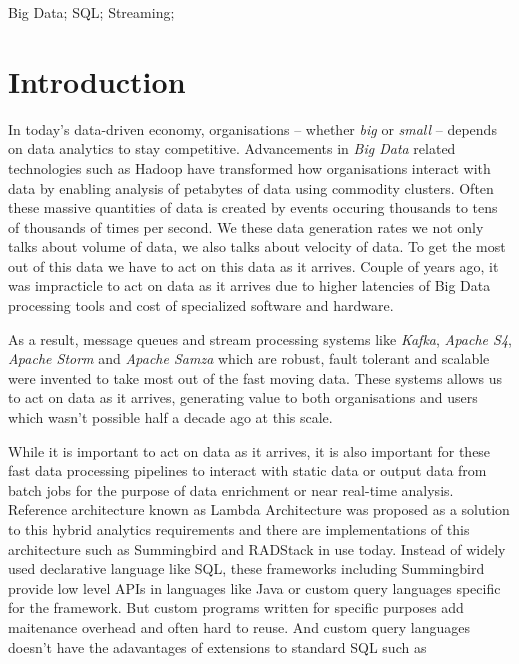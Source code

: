 \documentclass[10pt, conference, compsocconf]{IEEEtran}
\begin{document}
\begin{IEEEkeywords}
Big Data; SQL; Streaming;

\end{IEEEkeywords}


%
\IEEEpeerreviewmaketitle



\section{Introduction}
In today's data-driven economy, organisations -- whether \textit{big} or \textit{small} -- depends on data analytics to stay competitive. Advancements in \textit{Big Data} related technologies such as Hadoop have transformed how organisations interact with data by enabling analysis of petabytes of data using commodity clusters. Often these massive quantities of data is created by events occuring thousands to tens of thousands of times per second. We these data generation rates we not only talks about volume of data, we also talks about velocity of data. To get the most out of this data we have to act on this data as it arrives. Couple of years ago, it was impracticle to act on data as it arrives due to higher latencies of Big Data processing tools and cost of specialized software and hardware. 

As a result,  message queues and stream processing systems like \textit{Kafka}, \textit{Apache S4}, \textit{Apache Storm} and \textit{Apache Samza} which are robust, fault tolerant and scalable were invented to take most out of the fast moving data. These systems allows us to act on data as it arrives, generating value to both organisations and users which wasn't possible half a decade ago at this scale.

While it is important to act on data as it arrives, it is also important for these fast data processing pipelines to interact with static data or output data from batch jobs for the purpose of data enrichment or near real-time analysis. Reference architecture known as Lambda Architecture was proposed as a solution to this hybrid analytics requirements and there are implementations of this architecture such as Summingbird \cite{boykin2014summingbird} and RADStack \cite{metamarkets:radstack} in use today. Instead of widely used declarative language like SQL, these frameworks including Summingbird provide low level APIs in languages like Java or custom query languages specific for the framework. But custom programs written for specific purposes add maitenance overhead and often hard to reuse. And custom query languages doesn't have the adavantages of extensions to standard SQL such as 
\end{document}
